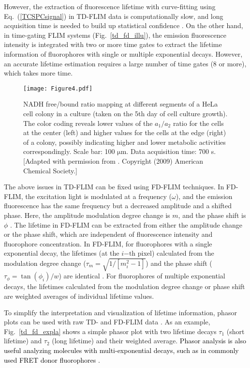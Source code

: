 \documentclass[12pt]{iopart}
\newcommand{\cc}[1]{\textcolor{black}{#1}}
\begin{document}
However, the extraction of fluorescence lifetime with curve-fitting using Eq.~(\ref{TCSPCsignal}) in TD-FLIM data is computationally slow, and long acquisition time is needed to build up statistical confidence \cite{error_prop}. On the other hand, in time-gating FLIM systems (Fig.~\ref{td_fd_illu}), the emission fluorescence intensity is integrated with two or more time gates to extract the lifetime information of fluorophores with single or multiple exponential decays. However, an accurate lifetime estimation requires a large number of time gates (8 or more), which takes more time.

\begin{figure}[!t]
\centering
\texttt{[image: Figure4.pdf]}
\caption{NADH free/bound ratio mapping at different segments of a HeLa cell colony in a culture (taken on the 5th day of cell culture growth). The color coding reveals lower values of the $a_{1}/a_{2}$ ratio for the cells at the center (left) and higher values for the cells at the edge (right) of a colony, possibly indicating higher and lower metabolic activities correspondingly. Scale bar: 100 $\mathrm{\mu}$m. Data acquisition time: 700 s. [Adapted with permission from \cite{nadh}. Copyright (2009) American Chemical Society.]}\label{fig1_nadh}
\end{figure}

The above issues in TD-FLIM can be fixed using FD-FLIM techniques. In FD-FLIM, the excitation light is modulated at a frequency ($\omega$), and the emission fluorescence has the same frequency but a decreased amplitude and a shifted phase. Here, the amplitude modulation degree change is $m$, and the phase shift is $\phi$ \cite{howard2013frequency}. The lifetime in FD-FLIM can be extracted from either the amplitude change or the phase shift, which are independent of fluorescence intensity and fluorophore concentration. In FD-FLIM, for fluorophores with a single exponential decay, the lifetimes (at the $i\mathrm{-th}$ pixel) calculated from the modulation degree change ($\tau_m = \sqrt{1/[m_{i}^2-1]}$) and the phase shift ($\tau_\phi = \tan(\phi_{i})/w$) are identical \cite{josa}. For fluorophores of multiple exponential decays, the lifetimes calculated from the modulation degree change or phase shift are weighted averages of individual lifetime values. 

To simplify the interpretation and visualization of lifetime information, phasor plots can be used with raw TD- and FD-FLIM data \cite{redford2005polar}. As an example, Fig.~\ref{td_fd_expla} shows a simple phasor plot with two lifetime decays $\tau_1$ (short lifetime) and $\tau_2$ (long lifetime) and their weighted average. \cc{Phasor analysis is also useful analyzing molecules with multi-exponential decays, such as in commonly used FRET donor fluorophores \cite{ranjit2018fit, fereidouni2014phasor_c1, lou2019phasor_c2, chen2015method_c3, caiolfa2007monomer_c4}.}
\end{document}
